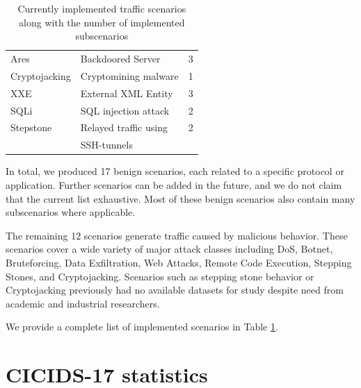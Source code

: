 \documentclass[runningheads]{llncs}
\begin{document}
\begin{table}
\begin{tabular}[t]{l|l|r}
 Ares & Backdoored Server & 3\\
 Cryptojacking & Cryptomining malware & 1\\
 XXE & External XML Entity & 3\\
 SQLi & SQL injection attack & 2 \\
 Stepstone & Relayed traffic using & 2\\
 &SSH-tunnels&\\
 \hline
\end{tabular}
\vspace{0.1cm} 
\caption{Currently implemented traffic scenarios along with the number of implemented subscenarios}
\label{tab:scen}
\end{table}



In total, we produced 17 benign scenarios, each related to a specific protocol or application. Further scenarios can be added in the future, and we do not claim that the current list exhaustive. Most of these benign scenarios also contain many subscenarios where applicable.

The remaining 12 scenarios generate traffic caused by malicious behavior. These scenarios cover a wide variety of major attack classes including DoS, Botnet, Bruteforcing, Data Exfiltration, Web Attacks, Remote Code Execution, Stepping Stones, and Cryptojacking. 
Scenarios such as stepping stone behavior or Cryptojacking previously had no available datasets for study despite need from academic and industrial researchers.


We provide a complete list of implemented scenarios in Table \ref{tab:scen}.

\section{CICIDS-17 statistics}
\end{document}
